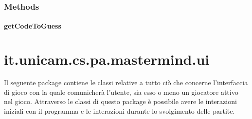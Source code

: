 \documentclass[letterpaper,10pt,italian,openany,oneside]{sphinxmanual}
\begin{document}
\subsubsection{Methods}
\label{\detokenize{source/it/unicam/cs/pa/mastermind/players/RandomBotMaker:methods}}

\paragraph{getCodeToGuess}
\label{\detokenize{source/it/unicam/cs/pa/mastermind/players/RandomBotMaker:getcodetoguess}}

\begin{fulllineitems}
\label{\detokenize{source/it/unicam/cs/pa/mastermind/players/RandomBotMaker:it.unicam.cs.pa.mastermind.players.RandomBotMaker.getCodeToGuess(InteractionView)}}
\end{fulllineitems}



\section{it.unicam.cs.pa.mastermind.ui}
\label{\detokenize{source/it/unicam/cs/pa/mastermind/ui/package-index:it-unicam-cs-pa-mastermind-ui}}\label{\detokenize{source/it/unicam/cs/pa/mastermind/ui/package-index::doc}}
Il seguente package contiene le classi relative a tutto ciò che concerne l’interfaccia di gioco con la quale comunicherà l’utente, sia esso o meno un giocatore attivo nel gioco. Attraverso le classi di questo package è possibile avere le interazioni iniziali con il programma e le interazioni durante lo svolgimento delle partite.

\label{\detokenize{source/it/unicam/cs/pa/mastermind/ui/package-index:package-it.unicam.cs.pa.mastermind.ui}}
\end{document}
